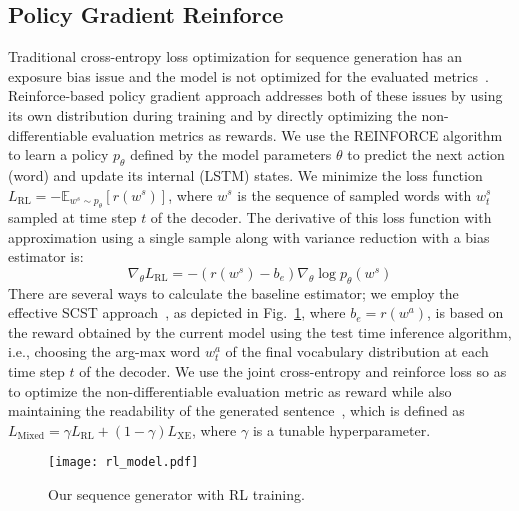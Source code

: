 \documentclass[11pt,a4paper]{article}
\begin{document}
\subsection{Policy Gradient Reinforce}
Traditional cross-entropy loss optimization for sequence generation has an exposure bias issue and the model is not optimized for the evaluated metrics~\cite{ranzato2015sequence}. Reinforce-based policy gradient approach addresses both of these issues by using its own distribution during training and by directly optimizing the non-differentiable evaluation metrics as rewards. We use the REINFORCE algorithm~\cite{williams1992simple,zaremba2015reinforcement} to learn a policy $p_\theta$ defined by the model parameters $\theta$ to predict the next action (word) and update its internal (LSTM) states. We minimize the loss function $L_{\textrm{RL}} = -\mathbb{E}_{w^s \sim p_\theta} [r(w^s)]$, where $w^s$ is the sequence of sampled words with $w^s_t$ sampled at time step $t$ of the decoder. The derivative of this loss function with approximation using a single sample along with variance reduction with a bias estimator is:
\begin{equation}
\nabla_\theta L_{\textrm{RL}} = -(r(w^s)-b_e) \nabla_\theta \log p_\theta(w^s)
\end{equation}
There are several ways to calculate the baseline estimator; we employ the effective SCST approach~\cite{rennie2016self}, as depicted in Fig.~\ref{fig:rl-model}, where $b_e=r(w^a)$, is based on the reward obtained by the current model using the test time inference algorithm, i.e., choosing the arg-max word $w^a_t$ of the final vocabulary distribution at each time step $t$ of the decoder. We use the joint cross-entropy and reinforce loss so as to optimize the non-differentiable evaluation metric as reward while also maintaining the readability of the generated sentence~\cite{wu2016google,paulus2017deep,pasunuru2017reinforced}, which is defined as $L_{\textrm{Mixed}} = \gamma L_{\textrm{RL}} + (1-\gamma)L_{\textrm{XE}}$, where $\gamma$ is a tunable hyperparameter.
\begin{figure}
\centering
\texttt{[image: rl\_model.pdf]}
\vspace{-10pt}
\caption{Our sequence generator with RL training.\vspace{-5pt}
}
\vspace{-15pt}
\label{fig:rl-model}
\end{figure}
 
\end{document}

